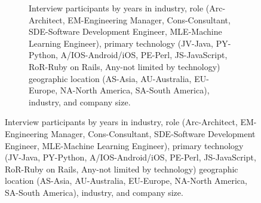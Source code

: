 \begin{figure}
\begin{subfigure}[b]{0.46\textwidth}
\begin{tabular}{p{.4cm}r{.4cm}l{2.5cm}l{2cm}l{2cm}l{2.2cm}r{1.5cm}}
    \bottomrule
    \end{tabular}
    \caption{Interview participants by years in industry, role (Arc-Architect, EM-Engineering Manager, Cons-Consultant, SDE-Software Development Engineer, MLE-Machine Learning Engineer), primary technology (JV-Java, PY-Python, A/IOS-Android/iOS, PE-Perl, JS-JavaScript, RoR-Ruby on Rails, Any-not limited by technology) geographic location (AS-Asia, AU-Australia, EU-Europe, NA-North America, SA-South America), industry, and company size.}
    \label{tab:participants}
    \hfill
\end{subfigure}
\label{fig:profile-dist}
\end{figure}